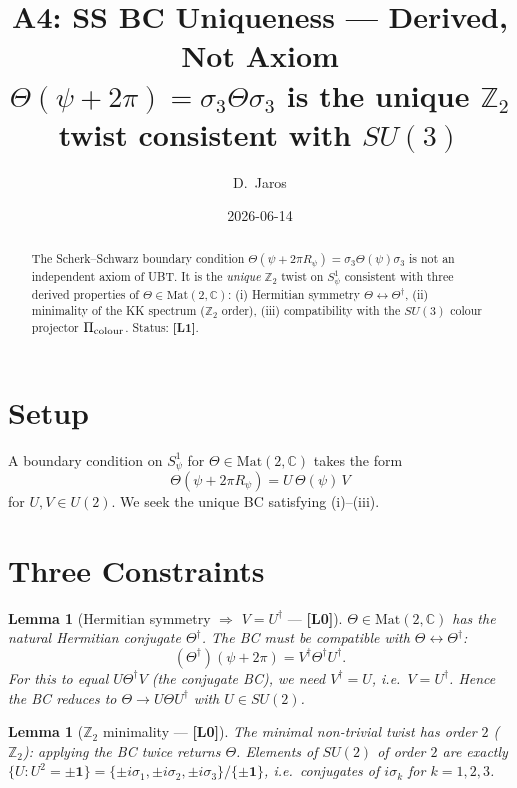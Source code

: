 \documentclass[12pt,a4paper]{article}
\title{\textbf{A4: SS BC Uniqueness — Derived, Not Axiom}\\[4pt]
\large $\Theta(\psi+2\pi)=\sigma_3\Theta\sigma_3$ is the unique $\mathbb{Z}_2$
twist consistent with $SU(3)$}
\author{D.~Jaros}
\date{2026-06-14}
\newtheorem{lemma}[theorem]{Lemma}
\theoremstyle{remark}\newtheorem{remark}[theorem]{Remark}
\newcommand{\Lz}{\textbf{[L0]}}
\newcommand{\Lo}{\textbf{[L1]}}
\begin{document}
\maketitle
\fi

\begin{abstract}
The Scherk--Schwarz boundary condition
$\Theta(\psi+2\pi R_\psi)=\sigma_3\Theta(\psi)\sigma_3$ is not an
independent axiom of UBT. It is the \emph{unique} $\mathbb{Z}_2$
twist on $S^1_\psi$ consistent with three derived properties of
$\Theta\in\mathrm{Mat}(2,\mathbb{C})$:
(i) Hermitian symmetry $\Theta\leftrightarrow\Theta^\dagger$,
(ii) minimality of the KK spectrum ($\mathbb{Z}_2$ order),
(iii) compatibility with the $SU(3)$ colour projector $\Pi_{\rm colour}$.
Status: \Lo.
\end{abstract}

\section{Setup}

A boundary condition on $S^1_\psi$ for $\Theta\in\mathrm{Mat}(2,\mathbb{C})$
takes the form
\[
  \Theta(\psi+2\pi R_\psi) = U\,\Theta(\psi)\,V
\]
for $U,V\in U(2)$. We seek the unique BC satisfying (i)--(iii).

\section{Three Constraints}

\begin{lemma}[Hermitian symmetry $\Rightarrow$ $V=U^\dagger$ — \Lz]
$\Theta\in\mathrm{Mat}(2,\mathbb C)$ has the natural Hermitian conjugate
$\Theta^\dagger$. The BC must be compatible with
$\Theta\leftrightarrow\Theta^\dagger$:
\[
  (\Theta^\dagger)(\psi+2\pi) = V^\dagger\Theta^\dagger U^\dagger.
\]
For this to equal $U\Theta^\dagger V$ (the conjugate BC), we need
$V^\dagger = U$, i.e.\ $V=U^\dagger$.
Hence the BC reduces to $\Theta\to U\Theta U^\dagger$ with $U\in SU(2)$.
\end{lemma}

\begin{lemma}[$\mathbb{Z}_2$ minimality — \Lz]
The minimal non-trivial twist has order $2$ ($\mathbb{Z}_2$): applying
the BC twice returns $\Theta$. Elements of $SU(2)$ of order $2$ are
exactly $\{U: U^2=\pm\mathbf{1}\} = \{\pm i\sigma_1, \pm i\sigma_2,
\pm i\sigma_3\}/\{\pm\mathbf{1}\}$, i.e.\ conjugates of $i\sigma_k$
for $k=1,2,3$.
\end{lemma}
\end{document}
